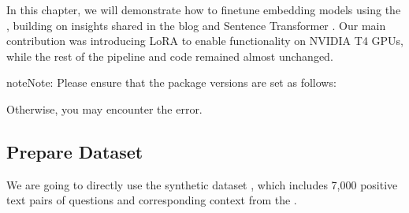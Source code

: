 \documentclass[letterpaper,11pt,english]{sphinxmanual}
\begin{document}
\sphinxAtStartPar
In this chapter, we will demonstrate how to fine\sphinxhyphen{}tune embedding models using the
, building on insights shared in the blog  and
Sentence Transformer . Our main contribution was introducing LoRA to enable functionality on
NVIDIA T4 GPUs, while the rest of the pipeline and code remained almost unchanged.

\begin{sphinxadmonition}{note}{Note:}
\sphinxAtStartPar
Please ensure that the package versions are set as follows:

\begin{sphinxVerbatim}[commandchars=\\\{\}]
    

   \PYGZbs{}
     \PYGZbs{}
      \PYGZbs{}
     \PYGZbs{}
\end{sphinxVerbatim}

\sphinxAtStartPar
Otherwise, you may encounter the error.
\end{sphinxadmonition}


\subsection{Prepare Dataset}
\label{\detokenize{finetuning:prepare-dataset}}
\sphinxAtStartPar
We are going to directly use the synthetic dataset , which includes 7,000
positive text pairs of questions and corresponding context from the .
\end{document}
